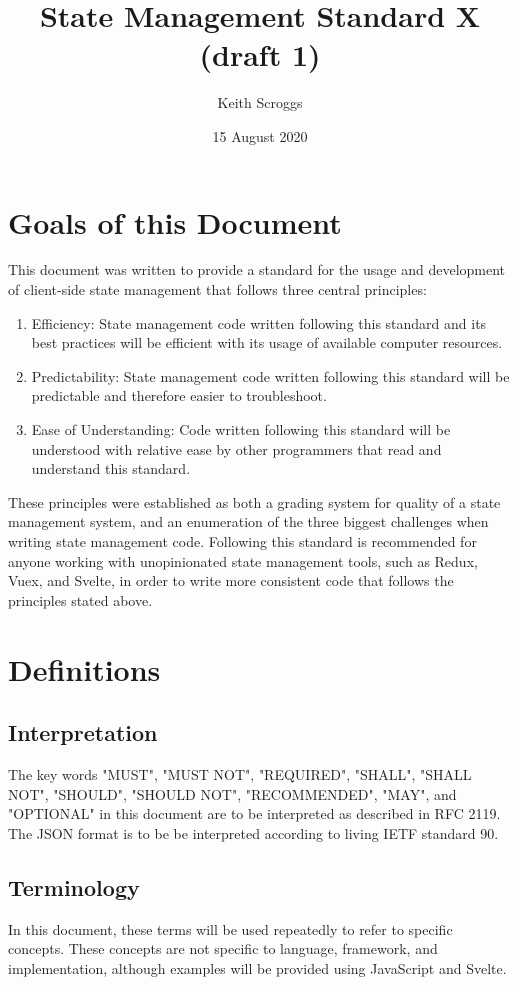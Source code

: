 \documentclass{article}
\title{State Management Standard X (draft 1)}
\author{Keith Scroggs}
\date{15 August 2020}
\begin{document}
\maketitle

\tableofcontents
\renewcommand{\lstlistlistingname}{Code Examples}
\lstlistoflistings
\newpage

\section{Goals of this Document}
This document was written to provide a standard for the usage and development of client-side state management that follows three central principles:
\begin{enumerate}
    \item Efficiency: State management code written following this standard and its best practices will be efficient with its usage of available computer resources.
    \item Predictability: State management code written following this standard will be predictable and therefore easier to troubleshoot.
    \item Ease of Understanding: Code written following this standard will be understood with relative ease by other programmers that read and understand this standard.
\end{enumerate}
These principles were established as both a grading system for quality of a state management system, and an enumeration of the three biggest challenges when writing state management code. Following this standard is recommended for anyone working with unopinionated state management tools, such as Redux, Vuex, and Svelte, in order to write more consistent code that follows the principles stated above.

\section{Definitions}

\subsection{Interpretation}
The key words "MUST", "MUST NOT", "REQUIRED", "SHALL", "SHALL NOT", "SHOULD", "SHOULD NOT", "RECOMMENDED", "MAY", and "OPTIONAL" in this document are to be interpreted as described in RFC 2119. The JSON format is to be be interpreted according to living IETF standard 90.

\subsection{Terminology}
In this document, these terms will be used repeatedly to refer to specific concepts. These concepts are not specific to language, framework, and implementation, although examples will be provided using JavaScript and Svelte.
\end{document}
